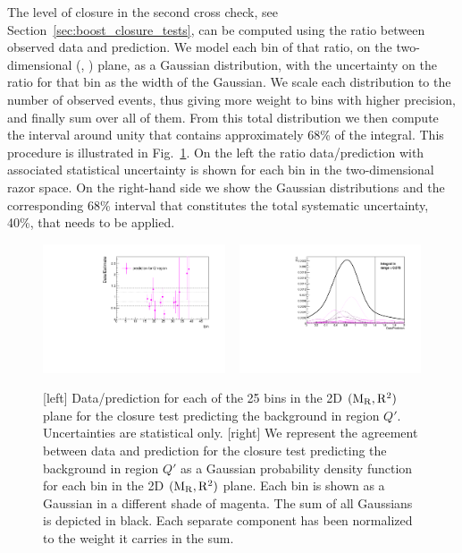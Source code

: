 The level of closure in the second cross check, see Section~\ref{sec:boost_closure_tests}, can be
computed using the ratio between observed data and prediction.
We model each bin of that ratio, on the two-dimensional (\mr, \rsq) plane, as a Gaussian
distribution, with the uncertainty on the ratio for that bin as the width of the Gaussian. 
We scale each distribution to the number of observed events, thus giving more weight to bins with
higher precision, and finally sum over all of them. 
From this total distribution we then compute the interval around unity that contains approximately
68\% of the integral. 
This procedure is illustrated in Fig.~\ref{fig:boost_systematics_closure_QCD}. 
On the left the ratio data/prediction with associated statistical uncertainty is shown for each bin
in the two-dimensional razor space. 
On the right-hand side we show the Gaussian distributions and the corresponding 68\% interval that
constitutes the total systematic uncertainty, 40\%, that needs to be applied. 

\begin{figure}[htpb]
\centering
\includegraphics[width=0.48\textwidth]{figures/razor_systematics/closure_summary_0p5_magenta}
~
\includegraphics[width=0.48\textwidth]{figures/razor_systematics/closure_summary_0p5_magenta_gauss2}
\caption{[left] Data/prediction for each of the 25 bins in the 2D $(\mathrm{M_R}, \mathrm{R^2})$ plane for the
closure test predicting the background in region $Q'$. Uncertainties are statistical only.
[right] We represent the agreement between data and prediction for the closure test predicting the
background in region $Q'$ as a Gaussian probability density function for each bin in the 2D
$(\mathrm{M_R},\mathrm{R^2})$ plane. Each bin is shown as a Gaussian in a different shade of magenta. The sum of all
Gaussians is depicted in black. Each separate component has been normalized to the weight it
carries in the sum. 
\label{fig:boost_systematics_closure_QCD}}
\end{figure}

